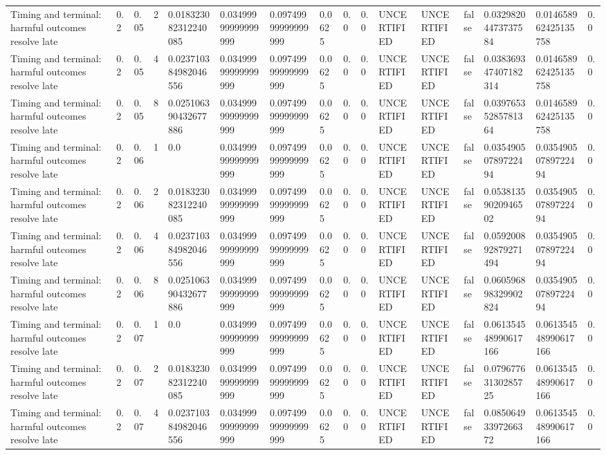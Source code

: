 \begin{tabular}{llllllllllllllll}
Timing and terminal: harmful outcomes resolve late & 0.2 & 0.05 & 2 & 0.018323082312240085 & 0.03499999999999999 & 0.09749999999999999 & 0.0625 & 0.0 & 0.0 & UNCERTIFIED & UNCERTIFIED & false & 0.03298204473737584 & 0.014658962425135758 & 0.0 \\
Timing and terminal: harmful outcomes resolve late & 0.2 & 0.05 & 4 & 0.023710384982046556 & 0.03499999999999999 & 0.09749999999999999 & 0.0625 & 0.0 & 0.0 & UNCERTIFIED & UNCERTIFIED & false & 0.038369347407182314 & 0.014658962425135758 & 0.0 \\
Timing and terminal: harmful outcomes resolve late & 0.2 & 0.05 & 8 & 0.025106390432677886 & 0.03499999999999999 & 0.09749999999999999 & 0.0625 & 0.0 & 0.0 & UNCERTIFIED & UNCERTIFIED & false & 0.03976535285781364 & 0.014658962425135758 & 0.0 \\
Timing and terminal: harmful outcomes resolve late & 0.2 & 0.06 & 1 & 0.0 & 0.03499999999999999 & 0.09749999999999999 & 0.0625 & 0.0 & 0.0 & UNCERTIFIED & UNCERTIFIED & false & 0.03549050789722494 & 0.03549050789722494 & 0.0 \\
Timing and terminal: harmful outcomes resolve late & 0.2 & 0.06 & 2 & 0.018323082312240085 & 0.03499999999999999 & 0.09749999999999999 & 0.0625 & 0.0 & 0.0 & UNCERTIFIED & UNCERTIFIED & false & 0.05381359020946502 & 0.03549050789722494 & 0.0 \\
Timing and terminal: harmful outcomes resolve late & 0.2 & 0.06 & 4 & 0.023710384982046556 & 0.03499999999999999 & 0.09749999999999999 & 0.0625 & 0.0 & 0.0 & UNCERTIFIED & UNCERTIFIED & false & 0.059200892879271494 & 0.03549050789722494 & 0.0 \\
Timing and terminal: harmful outcomes resolve late & 0.2 & 0.06 & 8 & 0.025106390432677886 & 0.03499999999999999 & 0.09749999999999999 & 0.0625 & 0.0 & 0.0 & UNCERTIFIED & UNCERTIFIED & false & 0.060596898329902824 & 0.03549050789722494 & 0.0 \\
Timing and terminal: harmful outcomes resolve late & 0.2 & 0.07 & 1 & 0.0 & 0.03499999999999999 & 0.09749999999999999 & 0.0625 & 0.0 & 0.0 & UNCERTIFIED & UNCERTIFIED & false & 0.061354548990617166 & 0.061354548990617166 & 0.0 \\
Timing and terminal: harmful outcomes resolve late & 0.2 & 0.07 & 2 & 0.018323082312240085 & 0.03499999999999999 & 0.09749999999999999 & 0.0625 & 0.0 & 0.0 & UNCERTIFIED & UNCERTIFIED & false & 0.07967763130285725 & 0.061354548990617166 & 0.0 \\
Timing and terminal: harmful outcomes resolve late & 0.2 & 0.07 & 4 & 0.023710384982046556 & 0.03499999999999999 & 0.09749999999999999 & 0.0625 & 0.0 & 0.0 & UNCERTIFIED & UNCERTIFIED & false & 0.08506493397266372 & 0.061354548990617166 & 0.0 \\

\end{tabular}
